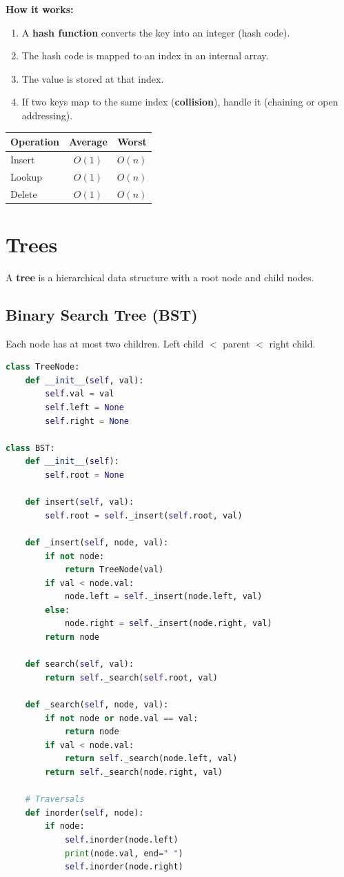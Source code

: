 \documentclass[12pt, a4paper, oneside]{book}
\begin{document}
\textbf{How it works:}
\begin{enumerate}[leftmargin=2em]
    \item A \textbf{hash function} converts the key into an integer (hash code).
    \item The hash code is mapped to an index in an internal array.
    \item The value is stored at that index.
    \item If two keys map to the same index (\textbf{collision}), handle it (chaining or open addressing).
\end{enumerate}

\begin{center}
\begin{tabular}{l c c}
\toprule
\textbf{Operation} & \textbf{Average} & \textbf{Worst} \\
\midrule
Insert & $O(1)$ & $O(n)$ \\
Lookup & $O(1)$ & $O(n)$ \\
Delete & $O(1)$ & $O(n)$ \\
\bottomrule
\end{tabular}
\end{center}

\section{Trees}

A \textbf{tree} is a hierarchical data structure with a root node and child nodes.

\subsection{Binary Search Tree (BST)}
Each node has at most two children. Left child $<$ parent $<$ right child.

\begin{lstlisting}[language=Python, caption={BST implementation}]
class TreeNode:
    def __init__(self, val):
        self.val = val
        self.left = None
        self.right = None

class BST:
    def __init__(self):
        self.root = None

    def insert(self, val):
        self.root = self._insert(self.root, val)

    def _insert(self, node, val):
        if not node:
            return TreeNode(val)
        if val < node.val:
            node.left = self._insert(node.left, val)
        else:
            node.right = self._insert(node.right, val)
        return node

    def search(self, val):
        return self._search(self.root, val)

    def _search(self, node, val):
        if not node or node.val == val:
            return node
        if val < node.val:
            return self._search(node.left, val)
        return self._search(node.right, val)

    # Traversals
    def inorder(self, node):
        if node:
            self.inorder(node.left)
            print(node.val, end=" ")
            self.inorder(node.right)
\end{lstlisting}
\end{document}
